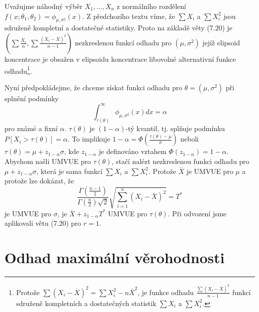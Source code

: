 \begin{example}
Uvažujme náhodný výběr $X_1, ..., X_n$ z normálního rozdělení $f(x; \theta_1, \theta_2) = \phi_{\mu, \sigma^2}(x)$. Z předchozího textu víme, že $\sum X_i$ a $\sum X_i^2$ jsou sdruženě kompletní a dostatečné statistiky. Proto na základě věty (7.20) je $\left(\sum \frac{X_i}{n}, \sum \frac{(X_i - \overline{X})^2}{n - 1}\right)$ nezkreslenou funkcí odhadu pro $(\mu, \sigma^2)$ jejíž elipsoid koncentrace je obsažen v elipsoidu koncentrace libovolné alternativní funkce odhadu\footnote{Protože $\sum(X_i - \overline{X})^2 = \sum X_i^2 - n \overline{X}^2$, je funkce odhadu $\frac{\sum (X_i - \overline{X})^2}{n - 1}$ funkcí sdruženě kompletních a dostatečných statistik $\sum X_i$ a $\sum X_i^2$.}.

Nyní předpokládejme, že chceme získat funkci odhadu pro $\theta = (\mu, \sigma^2)$ při splnění podmínky
\begin{equation*}
\int_{\tau(\theta)}^{\infty}\phi_{\mu, \sigma^2}(x)dx = \alpha
\end{equation*}
pro známé a fixní $\alpha$. $\tau(\theta)$ je $(1 - \alpha)$-tý kvantil, tj. splňuje podmínku $P[X_i > \tau(\theta)] = \alpha$. To implikuje $1 - \alpha = \Phi\left(\frac{\tau(\theta) - \mu}{\sigma}\right)$ neboli $\tau(\theta) = \mu + z_{1 - \alpha}\sigma$, kde $z_{1 - \alpha}$ je definováno vztahem $\Phi(z_{1 - \alpha}) = 1 - \alpha$. Abychom našli UMVUE pro $\tau(\theta)$, stačí nalézt nezkreslenou funkci odhadu pro $\mu + z_{1 - \alpha}\sigma$, která je sama funkcí $\sum X_i$ a $\sum X_i^2$. Protože $\overline{X}$ je UMVUE pro $\mu$ a protože lze dokázat, že
\begin{equation*}
\frac{\Gamma\left(\frac{n - 1}{2}\right)}{\Gamma \left(\frac{n}{2}\right) \sqrt{2}}\sqrt{\sum_{i = 1}^n(X_i - \overline{X})^2} = T^*
\end{equation*}
je UMVUE pro $\sigma$, je $\overline{X} + z_{1 - \alpha}T^*$ UMVUE pro $\tau(\theta)$. Při odvození jsme aplikovali větu (7.20) pro $r = 1$.
\end{example}

\section{Odhad maximální věrohodnosti}

